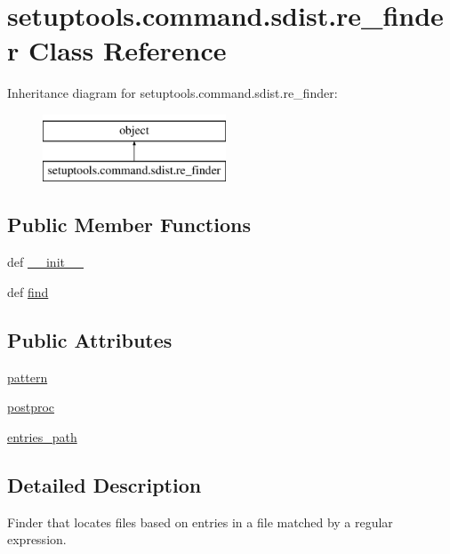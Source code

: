 \hypertarget{classsetuptools_1_1command_1_1sdist_1_1re__finder}{}\section{setuptools.\+command.\+sdist.\+re\+\_\+finder Class Reference}
\label{classsetuptools_1_1command_1_1sdist_1_1re__finder}
Inheritance diagram for setuptools.\+command.\+sdist.\+re\+\_\+finder\+:\begin{figure}[H]
\begin{center}
\leavevmode
\includegraphics[height=2.000000cm]{classsetuptools_1_1command_1_1sdist_1_1re__finder}
\end{center}
\end{figure}
\subsection*{Public Member Functions}
\begin{DoxyCompactItemize}
\item 
def \hyperlink{classsetuptools_1_1command_1_1sdist_1_1re__finder_a3612d3eb99796c8a778f9680a239c01e}{\+\_\+\+\_\+init\+\_\+\+\_\+}
\item 
def \hyperlink{classsetuptools_1_1command_1_1sdist_1_1re__finder_ade3bd78bd9afb62e6cd0e3aee4136123}{find}
\end{DoxyCompactItemize}
\subsection*{Public Attributes}
\begin{DoxyCompactItemize}
\item 
\hyperlink{classsetuptools_1_1command_1_1sdist_1_1re__finder_a015ec89edd4d1edffe7036a570ca465d}{pattern}
\item 
\hyperlink{classsetuptools_1_1command_1_1sdist_1_1re__finder_aa7d76aaaa572df58f5af876d0b4bfa43}{postproc}
\item 
\hyperlink{classsetuptools_1_1command_1_1sdist_1_1re__finder_a227b74fb20dfeeee7bd77f4ffcd81937}{entries\+\_\+path}
\end{DoxyCompactItemize}


\subsection{Detailed Description}
\begin{DoxyVerb}Finder that locates files based on entries in a file matched by a
regular expression.
\end{DoxyVerb}
 

